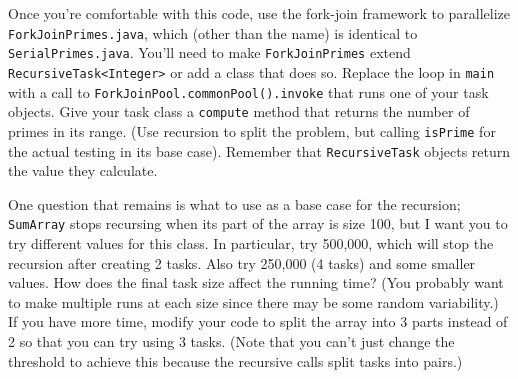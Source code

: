 \documentclass{article}
\begin{document}
Once you're comfortable with this code, use the fork-join framework to
parallelize {\tt ForkJoinPrimes.java}, which (other than the
name) is identical to {\tt SerialPrimes.java}.
You'll need to make {\tt ForkJoinPrimes} extend
{\tt RecursiveTask<Integer>} or add a class that does so.
Replace the loop in {\tt main} with a call to
{\tt ForkJoinPool.commonPool().invoke} that runs one of your task objects.
Give your task class a {\tt compute} method that returns the number of
primes in its range.
(Use recursion to split the problem, but calling {\tt isPrime} for
the actual testing in its base case).
Remember that {\tt RecursiveTask} objects return the value they
calculate.

One question that remains is what to use as a base case for the recursion;
{\tt SumArray} stops recursing when its part of the array is size 100,
but I want you to try different values for this class.
In particular, try 500,000, which will stop the recursion after
creating 2 tasks.
Also try 250,000 (4 tasks) and some smaller values.
How does the final task size affect the running time?
(You probably want to make multiple runs at each size since there may
be some random variability.)
If you have more time, modify your code to split the array into 3
parts instead of 2 so that you can try using 3 tasks.
(Note that you can't just change the threshold to achieve this because
the recursive calls split tasks into pairs.)

\vfill
\end{document}
